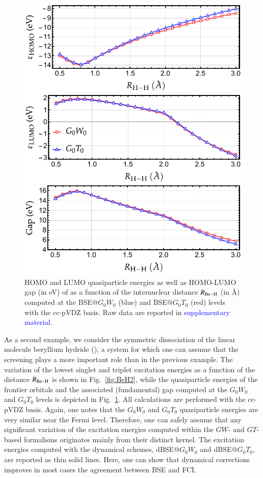\documentclass[aip,jcp,reprint,noshowkeys,superscriptaddress]{revtex4-1}
\newcommand{\SupMat}{\textcolor{blue}{supplementary material}}
\begin{document}
\begin{figure}[t]
	\includegraphics[width=\linewidth]{fig5}
	\caption{HOMO and LUMO quasiparticle energies as well as HOMO-LUMO gap (in \si{\eV}) of  as a function of the internuclear distance $R_{\ce{Be-H}}$ (in \si{\angstrom}) computed at the BSE@$G_0W_0$ (blue) and BSE@$G_0T_0$ (red) levels with the cc-pVDZ basis.
	Raw data are reported in {\SupMat}.}
	\label{fig:BeH2_gap}
\end{figure}

As a second example, we consider the symmetric dissociation of the linear molecule beryllium hydride (), a system for which one can assume that the screening plays a more important role than in the previous example.
The variation of the lowest singlet and triplet excitation energies as a function of the distance $R_{\ce{Be-H}}$ is shown in Fig.~\ref{fig:BeH2}, while the quasiparticle energies of the frontier orbitals and the associated (fundamental) gap computed at the $G_0W_0$ and $G_0T_0$ levels is depicted in Fig.~\ref{fig:BeH2_gap}.
All calculations are performed with the cc-pVDZ basis.
Again, one notes that the $G_0W_0$ and $G_0T_0$ quasiparticle energies are very similar near the Fermi level.
Therefore, one can safely assume that any significant variation of the excitation energies computed within the $GW$- and $GT$-based formalisms originates mainly from their distinct kernel.
The excitation energies computed with the dynamical schemes, dBSE@$G_0W_0$ and dBSE@$G_0T_0$, are reported as thin solid lines.
Here, one can show that dynamical corrections improves in most cases the agreement between BSE and FCI.
\end{document}
